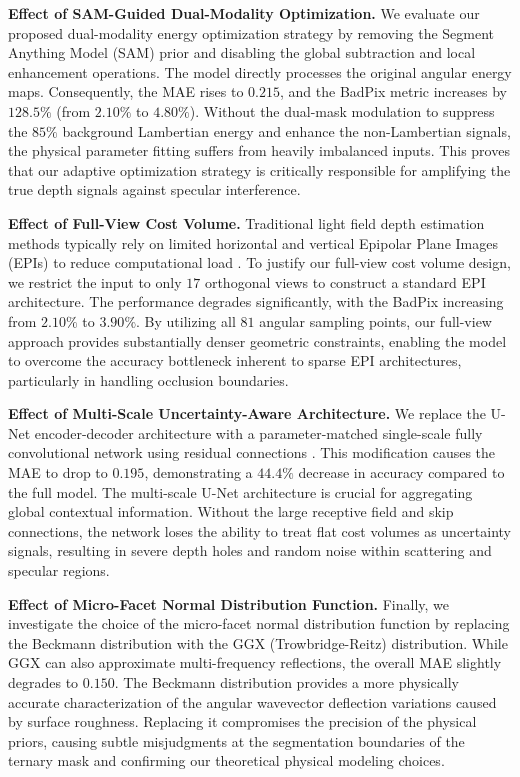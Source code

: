 \documentclass[lettersize,journal]{IEEEtran}
\begin{document}
\textbf{Effect of SAM-Guided Dual-Modality Optimization.} We evaluate our proposed dual-modality energy optimization strategy by removing the Segment Anything Model (SAM) prior \cite{kirillov2023} and disabling the global subtraction and local enhancement operations. The model directly processes the original angular energy maps. Consequently, the MAE rises to $0.215$, and the BadPix metric increases by $128.5\%$ (from $2.10\%$ to $4.80\%$). Without the dual-mask modulation to suppress the $85\%$ background Lambertian energy and enhance the non-Lambertian signals, the physical parameter fitting suffers from heavily imbalanced inputs. This proves that our adaptive optimization strategy is critically responsible for amplifying the true depth signals against specular interference.

\textbf{Effect of Full-View Cost Volume.} Traditional light field depth estimation methods typically rely on limited horizontal and vertical Epipolar Plane Images (EPIs) to reduce computational load \cite{heber2018}. To justify our full-view cost volume design, we restrict the input to only $17$ orthogonal views to construct a standard EPI architecture. The performance degrades significantly, with the BadPix increasing from $2.10\%$ to $3.90\%$. By utilizing all $81$ angular sampling points, our full-view approach provides substantially denser geometric constraints, enabling the model to overcome the accuracy bottleneck inherent to sparse EPI architectures, particularly in handling occlusion boundaries.

\textbf{Effect of Multi-Scale Uncertainty-Aware Architecture.} We replace the U-Net encoder-decoder architecture \cite{ronneberger2015} with a parameter-matched single-scale fully convolutional network using residual connections \cite{he2016}. This modification causes the MAE to drop to $0.195$, demonstrating a $44.4\%$ decrease in accuracy compared to the full model. The multi-scale U-Net architecture is crucial for aggregating global contextual information. Without the large receptive field and skip connections, the network loses the ability to treat flat cost volumes as uncertainty signals, resulting in severe depth holes and random noise within scattering and specular regions.

\textbf{Effect of Micro-Facet Normal Distribution Function.} Finally, we investigate the choice of the micro-facet normal distribution function by replacing the Beckmann distribution with the GGX (Trowbridge-Reitz) distribution. While GGX can also approximate multi-frequency reflections, the overall MAE slightly degrades to $0.150$. The Beckmann distribution provides a more physically accurate characterization of the angular wavevector deflection variations caused by surface roughness. Replacing it compromises the precision of the physical priors, causing subtle misjudgments at the segmentation boundaries of the ternary mask and confirming our theoretical physical modeling choices.
\end{document}
